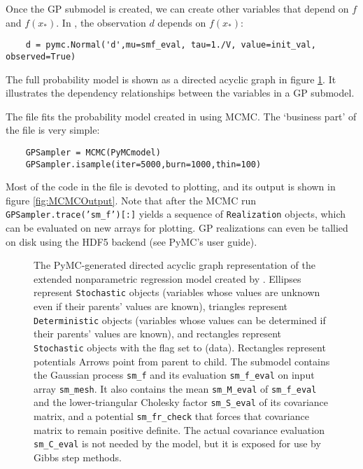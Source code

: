 Once the GP submodel is created, we can create other variables that depend on $f$ and $f(x_*)$. In , the observation $d$ depends on $f(x_*)$: 
\begin{verbatim}
    d = pymc.Normal('d',mu=smf_eval, tau=1./V, value=init_val, observed=True)
\end{verbatim}
The full probability model is shown as a directed acyclic graph in figure \ref{fig:unobservedModel}. It illustrates the dependency relationships between the variables in a GP submodel.

The file  fits the probability model created in  using MCMC. The `business part' of the file is very simple:
\begin{verbatim}
    GPSampler = MCMC(PyMCmodel)
    GPSampler.isample(iter=5000,burn=1000,thin=100)
\end{verbatim}
Most of the code in the file is devoted to plotting, and its output is shown in figure \ref{fig:MCMCOutput}. Note that after the MCMC run \texttt{GPSampler.trace('sm_f')[:]} yields a sequence of \texttt{Realization} objects, which can be evaluated on new arrays for plotting. GP realizations can even be tallied on disk using the HDF5 backend (see PyMC's user guide).

\begin{figure}
    \centering
    \caption{The PyMC-generated directed acyclic graph representation of the extended nonparametric regression model created by . Ellipses represent \texttt{Stochastic} objects (variables whose values are unknown even if their parents' values are known), triangles represent \texttt{Deterministic} objects (variables whose values can be determined if their parents' values are known), and rectangles represent \texttt{Stochastic} objects with the  flag set to  (data). Rectangles represent potentials Arrows point from parent to child. The submodel contains the Gaussian process \texttt{sm\_f} and its evaluation \texttt{sm\_f\_eval} on input array \texttt{sm\_mesh}. It also contains the mean \texttt{sm\_M\_eval} of \texttt{sm\_f\_eval} and the lower-triangular Cholesky factor \texttt{sm\_S\_eval} of its covariance matrix, and a potential \texttt{sm_fr_check} that forces that covariance matrix to remain positive definite. The actual covariance evaluation \texttt{sm\_C\_eval} is not needed by the model, but it is exposed for use by Gibbs step methods.}
    \label{fig:unobservedModel}
\end{figure}

